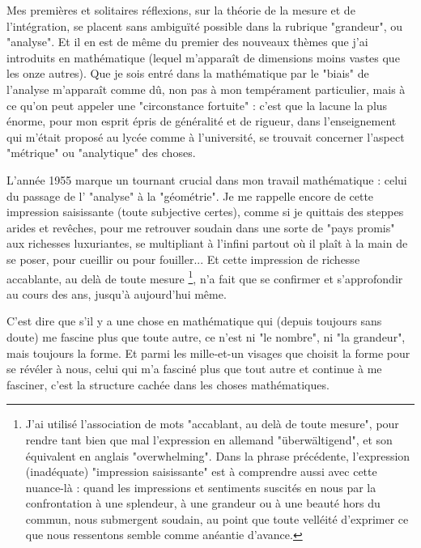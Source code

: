 Mes premières et solitaires réflexions, sur la théorie de la mesure et de l'intégration, se placent sans ambiguïté possible dans la rubrique "grandeur", ou "analyse". Et il en est de même du premier des nouveaux thèmes que j'ai introduits en mathématique (lequel m'apparaît de dimensions moins vastes que les onze autres). Que je sois entré dans la mathématique par le "biais" de l'analyse m'apparaît comme dû, non pas à mon tempérament particulier, mais à ce qu'on peut appeler une "circonstance fortuite" : c'est que la lacune la plus énorme, pour mon esprit épris de généralité et de rigueur, dans l'enseignement qui m'était proposé au lycée comme à l'université, se trouvait concerner l'aspect "métrique" ou "analytique" des choses.

L'année 1955 marque un tournant crucial dans mon travail mathématique : celui du passage de l' "analyse" à la "géométrie". Je me rappelle encore de cette impression saisissante (toute subjective certes), comme si je quittais des steppes arides et revêches, pour me retrouver soudain dans une sorte de "pays promis" aux richesses luxuriantes, se multipliant à l'infini partout où il plaît à la main de se poser, pour cueillir ou pour fouiller... Et cette impression de richesse accablante, au delà de toute mesure \footnote{J'ai utilisé l'association de mots "accablant, au delà de toute mesure", pour rendre tant bien que mal l'expression en allemand "überwältigend", et son équivalent en anglais "overwhelming". Dans la phrase précédente, l'expression (inadéquate) "impression saisissante" est à comprendre aussi avec cette nuance-là : quand les impressions et sentiments suscités en nous par la confrontation à une splendeur, à une grandeur ou à une beauté hors du commun, nous submergent soudain, au point que toute velléité d'exprimer ce que nous ressentons semble comme anéantie d'avance.}, n'a fait que se confirmer et s'approfondir au cours des ans, jusqu'à aujourd'hui même.

C'est dire que s'il y a une chose en mathématique qui (depuis toujours sans doute) me fascine plus que toute autre, ce n'est ni "le nombre", ni "la grandeur", mais toujours la forme. Et parmi les mille-et-un visages que choisit la forme pour se révéler à nous, celui qui m'a fasciné plus que tout autre et continue à me fasciner, c'est la structure cachée dans les choses mathématiques.

